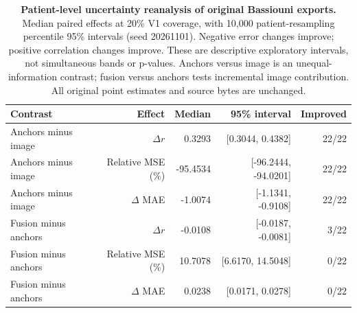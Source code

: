 \begin{table}[!htbp]
\caption{\textbf{Patient-level uncertainty reanalysis of original Bassiouni exports.} Median paired effects at 20\% V1 coverage, with 10,000 patient-resampling percentile 95\% intervals (seed 20261101). Negative error changes improve; positive correlation changes improve. These are descriptive exploratory intervals, not simultaneous bands or p-values. Anchors versus image is an unequal-information contrast; fusion versus anchors tests incremental image contribution. All original point estimates and source bytes are unchanged.}
\label{tab:journal_uncertainty}
\centering\footnotesize
\begin{tabular}{@{}lrrrr@{}}
\toprule
Contrast & Effect & Median & 95\% interval & Improved \\
\midrule
Anchors minus image & $\Delta r$ & 0.3293 & [0.3044, 0.4382] & 22/22 \\
Anchors minus image & Relative MSE (\%) & -95.4534 & [-96.2444, -94.0201] & 22/22 \\
Anchors minus image & $\Delta$ MAE & -1.0074 & [-1.1341, -0.9108] & 22/22 \\
Fusion minus anchors & $\Delta r$ & -0.0108 & [-0.0187, -0.0081] & 3/22 \\
Fusion minus anchors & Relative MSE (\%) & 10.7078 & [6.6170, 14.5048] & 0/22 \\
Fusion minus anchors & $\Delta$ MAE & 0.0238 & [0.0171, 0.0278] & 0/22 \\
\bottomrule
\end{tabular}
\end{table}
\FloatBarrier
